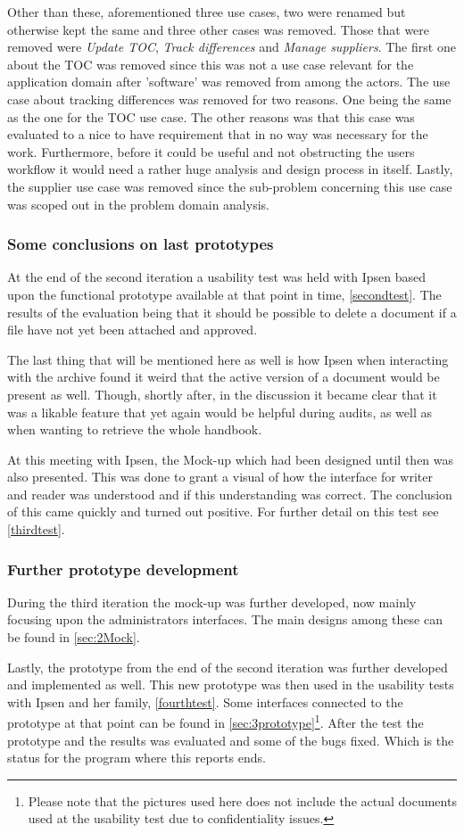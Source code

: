 Other than these, aforementioned three use cases, two were renamed but otherwise kept the same and three other cases was removed.
Those that were removed were \textit{Update TOC}, \textit{Track differences} and \textit{Manage suppliers}.
The first one about the TOC was removed since this was not a use case relevant for the application domain after 'software' was removed from among the actors.
The use case about tracking differences was removed for two reasons.
One being the same as the one for the TOC use case.
The other reasons was that this case was evaluated to a nice to have requirement that in no way was necessary for the work.
Furthermore, before it could be useful and not obstructing the users workflow it would need a rather huge analysis and design process in itself.
Lastly, the supplier use case was removed since the sub-problem concerning this use case was scoped out in the problem domain analysis.

\subsubsection*{Some conclusions on last prototypes}
At the end of the second iteration a usability test was held with Ipsen based upon the functional prototype available at that point in time, \cref{secondtest}.
The results of the evaluation being that it should be possible to delete a document if a file have not yet been attached and approved.

The last thing that will be mentioned here as well is how Ipsen when interacting with the archive found it weird that the active version of a document would be present as well.
Though, shortly after, in the discussion it became clear that it was a likable feature that yet again would be helpful during audits, as well as when wanting to retrieve the whole handbook.

At this meeting with Ipsen, the Mock-up which had been designed until then was also presented.
This was done to grant a visual of how the interface for writer and reader was understood and if this understanding was correct.
The conclusion of this came quickly and turned out positive.
For further detail on this test see \cref{thirdtest}.


\subsubsection*{Further prototype development}
During the third iteration the mock-up was further developed, now mainly focusing upon the administrators interfaces.
The main designs among these can be found in \cref{sec:2Mock}.

Lastly, the prototype from the end of the second iteration was further developed and implemented as well.
This new prototype was then used in the usability tests with Ipsen and her family, \cref{fourthtest}.
Some interfaces connected to the prototype at that point can be found in \cref{sec:3prototype}\footnote{Please note that the pictures used here does not include the actual documents used at the usability test due to confidentiality issues.}.
After the test the prototype and the results was evaluated and some of the bugs fixed.
Which is the status for the program where this reports ends.
